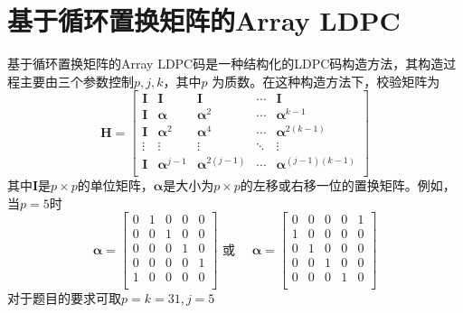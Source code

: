 \documentclass[lang=cn,11pt,a4paper,numbers]{elegantpaper}
\begin{document}
\section{基于循环置换矩阵的Array LDPC}
基于循环置换矩阵的Array LDPC码是一种结构化的LDPC码构造方法，其构造过程主要由三个参数控制$p, j, k$，其中$p$
为质数。在这种构造方法下，校验矩阵为
\begin{equation*}
\boldsymbol{H} = 
\begin{bmatrix} 
\boldsymbol{I} & \boldsymbol{I}            &\boldsymbol{I}        & \cdots & \boldsymbol{I} \\
\boldsymbol{I} & \boldsymbol{\alpha}       &\boldsymbol{\alpha}^2 & \cdots & \boldsymbol{\alpha}^{k-1} \\
\boldsymbol{I} & \boldsymbol{\alpha}^2     &\boldsymbol{\alpha}^4 & \cdots & \boldsymbol{\alpha}^{2(k-1)}\\
\vdots         & \vdots                    &\vdots                & \ddots & \vdots \\
\boldsymbol{I} & \boldsymbol{\alpha}^{j-1} &\boldsymbol{\alpha}^{2(j-1)}   & \cdots & \boldsymbol{\alpha}^{(j-1)(k-1)}\\
\end{bmatrix}
\end{equation*}
其中$\boldsymbol{I}$是$p\times p$的单位矩阵，$\boldsymbol{\alpha}$是大小为$p\times p$的左移或右移一位的置换矩阵。例如，当$p=5$时
\begin{equation}
    \boldsymbol{\alpha} = 
    \begin{bmatrix}
        0 & 1 & 0 & 0 & 0 \\
        0 & 0 & 1 & 0 & 0 \\
        0 & 0 & 0 & 1 & 0 \\
        0 & 0 & 0 & 0 & 1 \\
        1 & 0 & 0 & 0 & 0 \\
    \end{bmatrix}
    \text{ 或 }\quad
    \boldsymbol{\alpha} = 
    \begin{bmatrix}
        0 & 0 & 0 & 0 & 1\\
        1 & 0 & 0 & 0 & 0\\
        0 & 1 & 0 & 0 & 0\\
        0 & 0 & 1 & 0 & 0\\
        0 & 0 & 0 & 1 & 0\\
    \end{bmatrix}
\end{equation}
对于题目的要求可取$p=k=31, j = 5$
\end{document}
